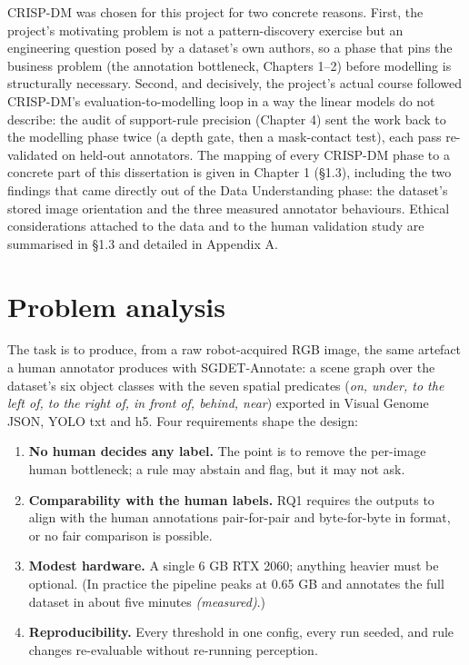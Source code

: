 CRISP-DM was chosen for this project for two concrete reasons. First, the project's motivating problem is not a pattern-discovery exercise but an engineering question posed by a dataset's own authors, so a phase that pins the business problem (the annotation bottleneck, Chapters 1--2) before modelling is structurally necessary. Second, and decisively, the project's actual course followed CRISP-DM's evaluation-to-modelling loop in a way the linear models do not describe: the audit of support-rule precision (Chapter 4) sent the work back to the modelling phase twice (a depth gate, then a mask-contact test), each pass re-validated on held-out annotators. The mapping of every CRISP-DM phase to a concrete part of this dissertation is given in Chapter 1 (\S1.3), including the two findings that came directly out of the Data Understanding phase: the dataset's stored image orientation and the three measured annotator behaviours. Ethical considerations attached to the data and to the human validation study are summarised in \S1.3 and detailed in Appendix A.

\section{Problem analysis}

The task is to produce, from a raw robot-acquired RGB image, the same artefact a human annotator produces with SGDET-Annotate: a scene graph over the dataset's six object classes with the seven spatial predicates (\textit{on, under, to the left of, to the right of, in front of, behind, near}) exported in Visual Genome JSON, YOLO txt and h5. Four requirements shape the design:

\begin{enumerate}
\item \textbf{No human decides any label.} The point is to remove the per-image human
bottleneck; a rule may abstain and flag, but it may not ask.
\item \textbf{Comparability with the human labels.} RQ1 requires the outputs to align
with the human annotations pair-for-pair and byte-for-byte in format, or no fair comparison is possible.
\item \textbf{Modest hardware.} A single 6 GB RTX 2060; anything heavier must be
optional. (In practice the pipeline peaks at 0.65 GB and annotates the full dataset in about five minutes \textit{(measured)}.)
\item \textbf{Reproducibility.} Every threshold in one config, every run seeded, and
rule changes re-evaluable without re-running perception.
\end{enumerate}

